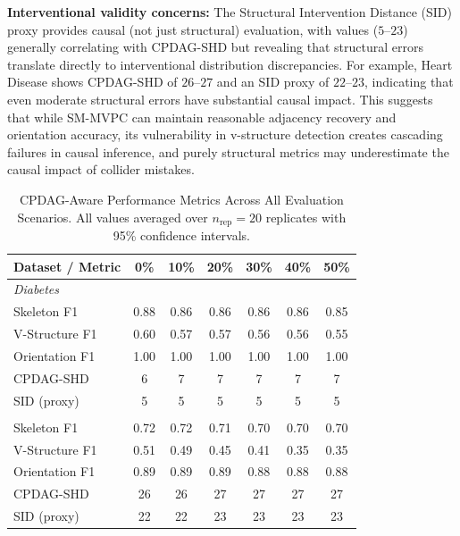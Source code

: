 \documentclass[runningheads]{llncs}
\begin{document}
\vspace{0.1cm}
\textbf{Interventional validity concerns:} The Structural Intervention Distance (SID) proxy provides causal (not just structural) evaluation, with values ($5$--$23$) generally correlating with CPDAG-SHD but revealing that structural errors translate directly to interventional distribution discrepancies. For example, Heart Disease shows CPDAG-SHD of $26$--$27$ and an SID proxy of $22$--$23$, indicating that even moderate structural errors have substantial causal impact. This suggests that while SM-MVPC can maintain reasonable adjacency recovery and orientation accuracy, its vulnerability in v-structure detection creates cascading failures in causal inference, and purely structural metrics may underestimate the causal impact of collider mistakes.

\begin{table}[t]
    \centering
    \caption{CPDAG-Aware Performance Metrics Across All Evaluation Scenarios.  All values averaged over $n_{\text{rep}}=20$ replicates with 95\% confidence intervals.}
    \label{tab:comprehensive_metrics}
    \begin{tabular}{lcccccc}
        \toprule
        \textbf{Dataset / Metric} & \textbf{0\%} & \textbf{10\%} & \textbf{20\%} & \textbf{30\%} & \textbf{40\%} & \textbf{50\%} \\
        \midrule
        \multicolumn{7}{l}{\textit{Diabetes}} \\
        \quad Skeleton F1 & 0.88 & 0.86 & 0.86 & 0.86 & 0.86 & 0.85 \\
        \quad V-Structure F1 & 0.60 & 0.57 & 0.57 & 0.56 & 0.56 & 0.55 \\
        \quad Orientation F1 & 1.00 & 1.00 & 1.00 & 1.00 & 1.00 & 1.00 \\
        \quad CPDAG-SHD & 6 & 7 & 7 & 7 & 7 & 7 \\
        \quad SID (proxy) & 5 & 5 & 5 & 5 & 5 & 5 \\
        \addlinespace[0.3em]
        \hline
        \multicolumn{7}{l}{\textit{Heart Disease}} \\
        \quad Skeleton F1 & 0.72 & 0.72 & 0.71 & 0.70 & 0.70 & 0.70 \\
        \quad V-Structure F1 & 0.51 & 0.49 & 0.45 & 0.41 & 0.35 & 0.35 \\
        \quad Orientation F1 & 0.89 & 0.89 & 0.89 & 0.88 & 0.88 & 0.88 \\
        \quad CPDAG-SHD & 26 & 26 & 27 & 27 & 27 & 27 \\
        \quad SID (proxy) & 22 & 22 & 23 & 23 & 23 & 23 \\

\end{tabular}
\end{table}
\end{document}
